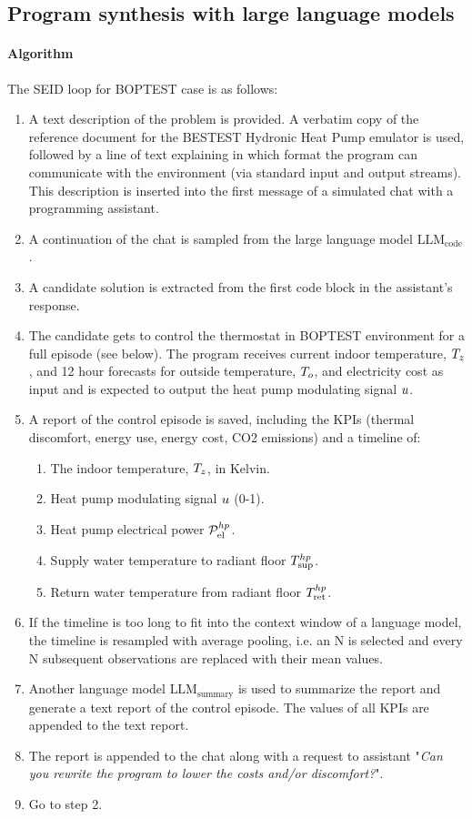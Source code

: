 \newpage
\subsection{Program synthesis with large language models}
\label{sec:boptest-ProgramSynthesis}

\paragraph{Algorithm} The SEID loop for BOPTEST case is as follows:
\begin{enumerate}
  \item A text description of the problem is provided. A verbatim copy of the reference document for the BESTEST Hydronic Heat Pump emulator is used, followed by a line of text explaining in which format the program can communicate with the environment (via standard input and output streams). This description is inserted into the first message of a simulated chat with a programming assistant.
  \item A continuation of the chat is sampled from the large language model $\text{LLM}_\text{code}$.
  \item A candidate solution is extracted from the first code block in the assistant’s response.
  \item The candidate gets to control the thermostat in BOPTEST environment for a full episode (see below). The program receives current indoor temperature, $T_z$, and 12 hour forecasts for outside temperature, $T_o$, and electricity cost as input and is expected to output the heat pump modulating signal $u$.
  \item A report of the control episode is saved, including the KPIs (thermal discomfort, energy use, energy cost, CO2 emissions) and a timeline of:
  \begin{enumerate}
      \item The indoor temperature, $T_z$, in Kelvin.
      \item Heat pump modulating signal $u$ (0-1).
      \item Heat pump electrical power ${\mathcal{P}_\text{el}^{hp}}$.
      \item Supply water temperature to radiant floor ${T_\text{sup}^{hp}}$.
      \item Return water temperature from radiant floor ${T_\text{ret}^{hp}}$.
  \end{enumerate}
  \item If the timeline is too long to fit into the context window of a language model, the timeline is resampled with average pooling, i.e. an N is selected and every N subsequent observations are replaced with their mean values.
  \item Another language model $\text{LLM}_\text{summary}$ is used to summarize the report and generate a text report of the control episode. The values of all KPIs are appended to the text report.
  \item The report is appended to the chat along with a request to assistant "\textit{Can you rewrite the program to lower the costs and/or discomfort?}".
  \item Go to step 2.
\end{enumerate}

